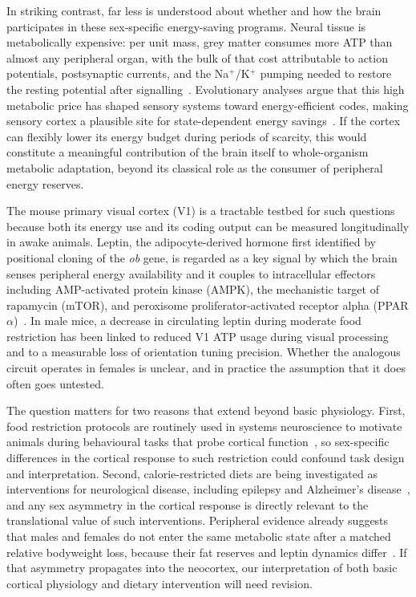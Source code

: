 \documentclass[11pt]{article}
\begin{document}
In striking contrast, far less is understood about whether and how the brain participates in these sex-specific energy-saving programs. Neural tissue is metabolically expensive: per unit mass, grey matter consumes more ATP than almost any peripheral organ, with the bulk of that cost attributable to action potentials, postsynaptic currents, and the Na$^+$/K$^+$ pumping needed to restore the resting potential after signalling~\citep{attwell2001energy, niven2008energy}. Evolutionary analyses argue that this high metabolic price has shaped sensory systems toward energy-efficient codes, making sensory cortex a plausible site for state-dependent energy savings~\citep{niven2008energy}. If the cortex can flexibly lower its energy budget during periods of scarcity, this would constitute a meaningful contribution of the brain itself to whole-organism metabolic adaptation, beyond its classical role as the consumer of peripheral energy reserves.

The mouse primary visual cortex (V1) is a tractable testbed for such questions because both its energy use and its coding output can be measured longitudinally in awake animals. Leptin, the adipocyte-derived hormone first identified by positional cloning of the \textit{ob} gene, is regarded as a key signal by which the brain senses peripheral energy availability and it couples to intracellular effectors including AMP-activated protein kinase (AMPK), the mechanistic target of rapamycin (mTOR), and peroxisome proliferator-activated receptor alpha (PPAR$\alpha$)~\citep{zhang1994positional, steinberg2023ampk, laplante2013mtorc1, yao2022ampk, ward2016ampk, su2019hsf1, lopezdominguez2016omega3}. In male mice, a decrease in circulating leptin during moderate food restriction has been linked to reduced V1 ATP usage during visual processing and to a measurable loss of orientation tuning precision. Whether the analogous circuit operates in females is unclear, and in practice the assumption that it does often goes untested.

The question matters for two reasons that extend beyond basic physiology. First, food restriction protocols are routinely used in systems neuroscience to motivate animals during behavioural tasks that probe cortical function~\citep{scott2023cisplatin, heinz2021foraging}, so sex-specific differences in the cortical response to such restriction could confound task design and interpretation. Second, calorie-restricted diets are being investigated as interventions for neurological disease, including epilepsy and Alzheimer's disease~\citep{greenfield2025lifespan}, and any sex asymmetry in the cortical response is directly relevant to the translational value of such interventions. Peripheral evidence already suggests that males and females do not enter the same metabolic state after a matched relative bodyweight loss, because their fat reserves and leptin dynamics differ~\citep{kwon2014gpr30, nestor2014crosstalk, elsehrawy2025eralpha}. If that asymmetry propagates into the neocortex, our interpretation of both basic cortical physiology and dietary intervention will need revision.
\end{document}
